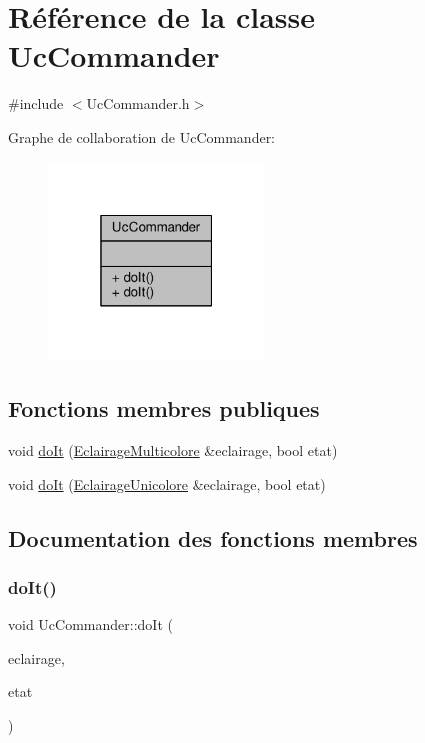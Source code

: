 \hypertarget{classUcCommander}{}\section{Référence de la classe Uc\+Commander}
\label{classUcCommander}


{\ttfamily \#include $<$Uc\+Commander.\+h$>$}



Graphe de collaboration de Uc\+Commander\+:
\nopagebreak
\begin{figure}[H]
\begin{center}
\leavevmode
\includegraphics[width=163pt]{classUcCommander__coll__graph}
\end{center}
\end{figure}
\subsection*{Fonctions membres publiques}
\begin{DoxyCompactItemize}
\item 
void \hyperlink{classUcCommander_a1a146cc03213ae7b129d274756fba084}{do\+It} (\hyperlink{classEclairageMulticolore}{Eclairage\+Multicolore} \&eclairage, bool etat)
\item 
void \hyperlink{classUcCommander_a3f58b4a5484c34d0f99f2b154ea0261b}{do\+It} (\hyperlink{classEclairageUnicolore}{Eclairage\+Unicolore} \&eclairage, bool etat)
\end{DoxyCompactItemize}


\subsection{Documentation des fonctions membres}
\mbox{\label{classUcCommander_a1a146cc03213ae7b129d274756fba084}} 
\subsubsection{\texorpdfstring{do\+It()}{doIt()}\hspace{0.1cm}{\footnotesize\ttfamily [1/2]}}
{\footnotesize\ttfamily void Uc\+Commander\+::do\+It (\begin{DoxyParamCaption}\item[{\hyperlink{classEclairageMulticolore}{Eclairage\+Multicolore} \&}]{eclairage,  }\item[{bool}]{etat }\end{DoxyParamCaption})}

